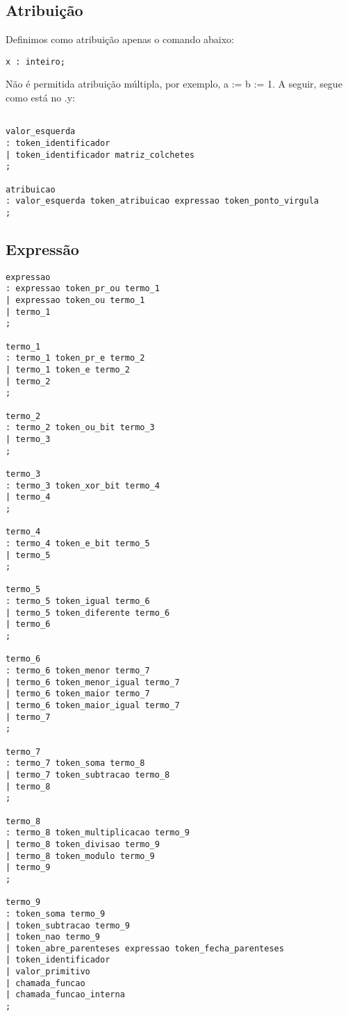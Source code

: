 \documentclass[a4paper,10pt]{article}
\begin{document}
\subsection{Atribuição}

Definimos como atribuição apenas o comando abaixo:

\begin{verbatim}
x : inteiro;
\end{verbatim}

 Não é permitida atribuição múltipla, por exemplo, a := b := 1. A seguir, segue como está no .y:

\begin{verbatim}

valor_esquerda
: token_identificador
| token_identificador matriz_colchetes
;

atribuicao
: valor_esquerda token_atribuicao expressao token_ponto_virgula
;

\end{verbatim}

\subsection{Expressão}
\begin{verbatim}
expressao
: expressao token_pr_ou termo_1
| expressao token_ou termo_1
| termo_1
;

termo_1
: termo_1 token_pr_e termo_2
| termo_1 token_e termo_2
| termo_2
;

termo_2
: termo_2 token_ou_bit termo_3
| termo_3
;

termo_3
: termo_3 token_xor_bit termo_4
| termo_4
;

termo_4
: termo_4 token_e_bit termo_5
| termo_5
;

termo_5
: termo_5 token_igual termo_6
| termo_5 token_diferente termo_6
| termo_6
;

termo_6
: termo_6 token_menor termo_7
| termo_6 token_menor_igual termo_7
| termo_6 token_maior termo_7
| termo_6 token_maior_igual termo_7
| termo_7
;

termo_7
: termo_7 token_soma termo_8
| termo_7 token_subtracao termo_8
| termo_8
;

termo_8
: termo_8 token_multiplicacao termo_9
| termo_8 token_divisao termo_9
| termo_8 token_modulo termo_9
| termo_9
;

termo_9
: token_soma termo_9
| token_subtracao termo_9
| token_nao termo_9
| token_abre_parenteses expressao token_fecha_parenteses
| token_identificador
| valor_primitivo
| chamada_funcao
| chamada_funcao_interna
;
\end{verbatim}
\end{document}
